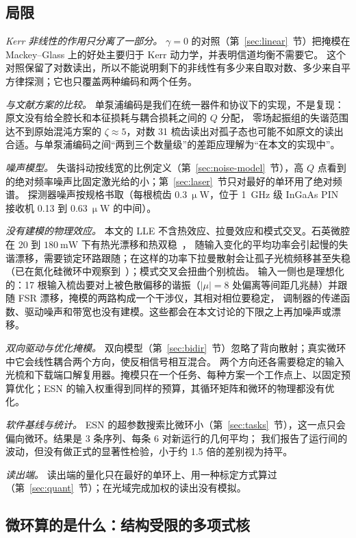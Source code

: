 \subsection{局限}

\emph{Kerr 非线性的作用只分离了一部分。} $\gamma=0$ 的对照（第~\ref{sec:linear}~节）把掩模在 Mackey--Glass 上的好处主要归于 Kerr 动力学，并表明信道均衡不需要它。
这个对照保留了对数读出，所以不能说明剩下的非线性有多少来自取对数、多少来自平方律探测；它也只覆盖两种编码和两个任务。

\emph{与文献方案的比较。} 单泵浦编码是我们在统一器件和协议下的实现，不是复现：原文没有给全腔长和本征损耗与耦合损耗之间的 $Q$ 分配，
零场起振组的失谐范围达不到原始混沌方案的 $\zeta\approx5$，对数 31 梳齿读出对孤子态也可能不如原文的读出合适。与单泵浦编码之间“两到三个数量级”的差距应理解为“在本文的实现中”。

\emph{噪声模型。} 失谐抖动按线宽的比例定义（第~\ref{sec:noise-model}~节），高 $Q$ 点看到的绝对频率噪声比固定激光给的小；第~\ref{sec:laser}~节只对最好的单环用了绝对频谱。
探测器噪声按规格书取（每根梳齿 $0.3~\upmu\mathrm{W}$，位于 1~GHz 级 InGaAs PIN 接收机 0.13 到 $0.63~\upmu\mathrm{W}$ 的中间）。

\emph{没有建模的物理效应。} 本文的 LLE 不含热效应、拉曼效应和模式交叉。石英微腔在 20 到 $180~\mathrm{mW}$ 下有热光漂移和热双稳~\cite{carmon2004}，
随输入变化的平均功率会引起慢的失谐漂移，需要锁定环路跟随；在这样的功率下拉曼散射会让孤子光梳频移甚至失稳（已在氮化硅微环中观察到~\cite{karpov2016}）；模式交叉会扭曲个别梳齿。
输入一侧也是理想化的：17 根输入梳齿要对上被色散偏移的谐振（$|\mu|=8$ 处偏离等间距几兆赫）并跟随 FSR 漂移，掩模的两路构成一个干涉仪，其相对相位要稳定，
调制器的传递函数、驱动噪声和带宽也没有建模。这些都会在本文讨论的下限之上再加噪声或漂移。

\emph{双向驱动与优化掩模。} 双向模型（第~\ref{sec:bidir}~节）忽略了背向散射；真实微环中它会线性耦合两个方向，使反相信号相互混合。
两个方向还各需要稳定的输入光梳和下载端口解复用器。掩模只在一个任务、每种方案一个工作点上、以固定预算优化；ESN 的输入权重得到同样的预算，其循环矩阵和微环的物理都没有优化。

\emph{软件基线与统计。} ESN 的超参数搜索比微环小（第~\ref{sec:tasks}~节），这一点只会偏向微环。结果是 3 条序列、每条 6 对新运行的几何平均；
我们报告了运行间的波动，但没有做正式的显著性检验，小于约 1.5 倍的差别视为持平。

\emph{读出端。} 读出端的量化只在最好的单环上、用一种标定方式算过（第~\ref{sec:quant}~节）；在光域完成加权的读出没有模拟。

\subsection{微环算的是什么：结构受限的多项式核}\label{sec:kernel}

